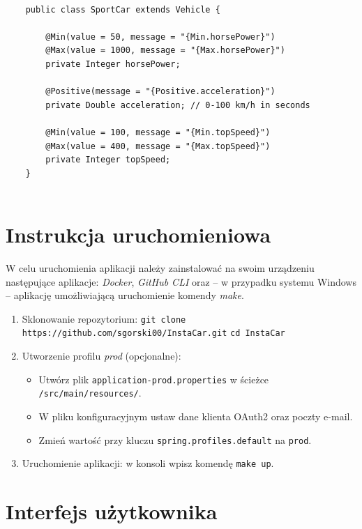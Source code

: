 \documentclass[12pt]{article}
\begin{document}
\begin{lstlisting}[style=customJava, caption=Klasa dziedzicząca SportCar]

	public class SportCar extends Vehicle {
		
		@Min(value = 50, message = "{Min.horsePower}")
		@Max(value = 1000, message = "{Max.horsePower}")
		private Integer horsePower;
		
		@Positive(message = "{Positive.acceleration}")
		private Double acceleration; // 0-100 km/h in seconds
		
		@Min(value = 100, message = "{Min.topSpeed}")
		@Max(value = 400, message = "{Max.topSpeed}")
		private Integer topSpeed;
	}
	
\end{lstlisting}	

\newpage
\section{Instrukcja uruchomieniowa}
W celu uruchomienia aplikacji należy zainstalować na swoim urządzeniu następujące aplikacje: \textit{Docker}, \textit{GitHub CLI} oraz – w przypadku systemu Windows – aplikację umożliwiającą uruchomienie komendy \textit{make}.

\begin{enumerate}
    \item Sklonowanie repozytorium: \newline
    \texttt{git clone https://github.com/sgorski00/InstaCar.git} \newline
    \texttt{cd InstaCar}
    
    \item Utworzenie profilu \textit{prod} (opcjonalne):
    \begin{itemize}
        \item Utwórz plik \texttt{application-prod.properties} w ścieżce \texttt{/src/main/resources/}.
        \item W pliku konfiguracyjnym ustaw dane klienta OAuth2 oraz poczty e-mail.
        \item Zmień wartość przy kluczu \texttt{spring.profiles.default} na \texttt{prod}.
    \end{itemize}
    
    \item Uruchomienie aplikacji: w konsoli wpisz komendę \texttt{make up}.
\end{enumerate}


\newpage
\section{Interfejs użytkownika}
\end{document}
